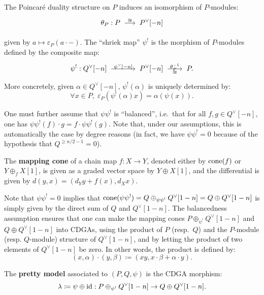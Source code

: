 The Poincaré duality structure on $P$ induces an isomorphism of $P$-modules:
\begin{equation}
  \theta_{P} : P \tkrightarrow{\cong} P^{\vee}[-n]%
  \label{cnfbnd.eq.theta-p}
\end{equation}

given by $a \mapsto \varepsilon_{P}(a \cdot -)$.
The ``shriek map'' $\psi^{!}$ is the morphism of $P$-modules defined by the composite map:
\begin{equation}
  \psi^{!} : Q^{\vee}[-n] \tkrightarrow{\psi^{\vee}[-n]} P^{\vee}[-n] \tkrightarrow[\cong]{\theta^{-1}_{P}} P.
\end{equation}
More concretely, given $\alpha \in Q^{\vee}[-n]$, $\psi^{!}(\alpha)$ is uniquely determined by:
\begin{equation}
  \forall x \in P, \; \varepsilon_{P}(\psi^{!}(\alpha) x) = \alpha(\psi(x)).
\end{equation}


One must further assume that $\psi\psi^{!}$ is ``balanced'', i.e.\ that for all $f,g \in Q^{\vee}[-n]$, one has $\psi\psi^{!}(f) \cdot g = f \cdot \psi\psi^{!}(g)$.
Note that, under our assumptions, this is automatically the case by degree reasons (in fact, we have $\psi\psi^{!} = 0$ because of the hypothesis that $Q^{\geq n/2-1} = 0$).

\begin{definition}
  The \textbf{mapping cone} of a chain map $f : X \to Y$, denoted either by $\operatorname{cone}(f)$ or $Y \oplus_{f} X[1]$, is given as a graded vector space by $Y \oplus X[1]$, and the differential is given by $d(y,x) = (d_{Y}y + f(x), d_{X}x)$.
\end{definition}

Note that $\psi\psi^{!} = 0$ implies that $\operatorname{cone}(\psi\psi^{!}) = Q \oplus_{\psi\psi^{!}} Q^{\vee}[1-n] = Q \oplus Q^{\vee}[1-n]$ is simply given by the direct sum of $Q$ and $Q^{\vee}[1-n]$.
The balancedness assumption ensures that one can make the mapping cones $P \oplus_{\psi^{!}} Q^{\vee}[1-n]$ and $Q \oplus Q^{\vee}[1-n]$ into CDGAs, using the product of $P$ (resp.\ $Q$) and the $P$-module (resp. $Q$-module) structure of $Q^{\vee}[1-n]$, and by letting the product of two elements of $Q^{\vee}[1-n]$ be zero. In other words, the product is defined by:
\[ (x,\alpha) \cdot (y,\beta) \coloneqq (xy, x \cdot \beta + \alpha \cdot y). \]

\begin{definition}
The \textbf{pretty model} associated to $(P,Q,\psi)$ is the CDGA morphism:
\[ \lambda \coloneqq \psi \oplus \operatorname{id} : P \oplus_{\psi^{!}} Q^{\vee}[1-n] \rightarrow Q \oplus Q^{\vee}[1-n]. \]
\end{definition}


